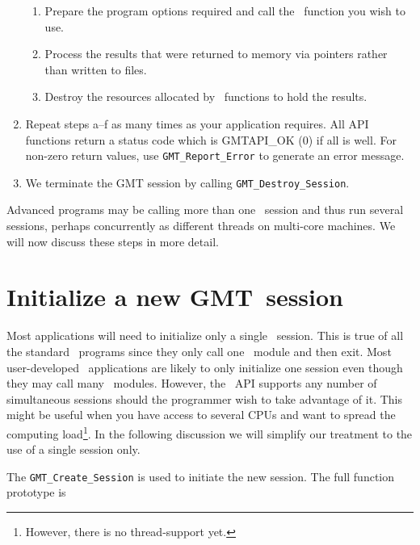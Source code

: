 \documentclass{report}
\begin{document}
\begin{enumerate}
\begin{enumerate}
\item Prepare the program options required and call the \GMT\ function you wish to use.
\item Process the results that were returned to memory via pointers rather than written to files.
\item Destroy the resources allocated by \GMT\ functions to hold the results.
\end{enumerate}
\item Repeat steps a--f as many times as your application requires.  All API functions
return a status code which is GMTAPI\_OK (0) if all is well.  For non-zero return values, use
\texttt{GMT\_Report\_Error} to generate an error message.
\item We terminate the GMT session by calling \texttt{GMT\_Destroy\_Session}.
\end{enumerate}

Advanced programs may be calling more than one \GMT\ session and thus run several
sessions, perhaps  concurrently as different threads on multi-core machines.
We will now discuss these steps in more detail.

\section{Initialize a new GMT\ session}

Most applications will need to initialize only a single \GMT\ session.  This is true of all
the standard \GMT\ programs since they only call one \GMT\ module and then exit.  Most
user-developed \GMT\ applications are likely to only initialize one session even though
they may call many \GMT\ modules.  However, the \GMT\ API supports any number of
simultaneous sessions should the programmer wish to take advantage of it.  This
might be useful when you have access to several CPUs and want to spread the computing load\footnote{However,
there is no thread-support yet.}.
In the following discussion we will simplify our treatment to the use
of a single session only.

The \texttt{GMT\_Create\_Session} is used to initiate the new session.  The full
function prototype is
\end{document}
